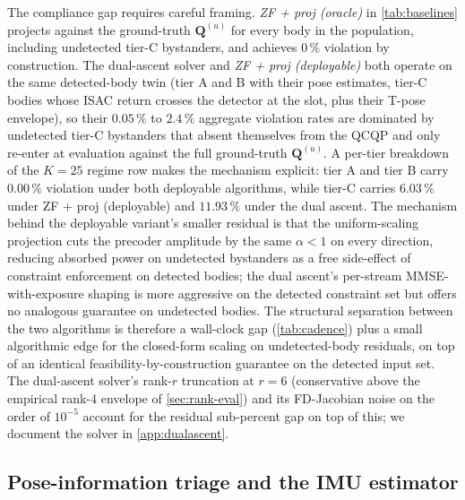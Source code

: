 \documentclass[journal,twocolumn,10pt]{IEEEtran}
\theoremstyle{plain}
\theoremstyle{remark}
\newcommand{\Qmat}{\mathbf{Q}}
\begin{document}
The compliance gap requires careful framing. \emph{ZF + proj
(oracle)} in \cref{tab:baselines} projects against the ground-truth
$\Qmat^{(u)}$ for every body in the population, including
undetected tier-C bystanders, and achieves $0\,\%$ violation by
construction. The dual-ascent solver and \emph{ZF + proj
(deployable)} both operate on the same detected-body twin (tier A
and B with their pose estimates, tier-C bodies whose ISAC return
crosses the detector at the slot, plus their T-pose envelope), so
their $0.05\,\%$ to $2.4\,\%$ aggregate violation rates are
dominated by undetected tier-C bystanders that absent themselves
from the QCQP and only re-enter at evaluation against the full
ground-truth $\Qmat^{(u)}$. A per-tier breakdown of the $K = 25$
regime row makes the mechanism explicit: tier A and tier B carry
$0.00\,\%$ violation under both deployable algorithms, while
tier-C carries $6.03\,\%$ under ZF + proj (deployable) and
$11.93\,\%$ under the dual ascent. The mechanism behind the
deployable variant's smaller residual is that the uniform-scaling
projection cuts the precoder amplitude by the same $\alpha < 1$
on every direction, reducing absorbed power on undetected bystanders
as a free side-effect of constraint enforcement on detected bodies;
the dual ascent's per-stream MMSE-with-exposure shaping is more
aggressive on the detected constraint set but offers no analogous
guarantee on undetected bodies. The structural separation between
the two algorithms is therefore a wall-clock gap (\cref{tab:cadence})
plus a small algorithmic edge for the closed-form scaling on
undetected-body residuals, on top of an identical
feasibility-by-construction guarantee on the detected input set.
The dual-ascent solver's rank-$r$ truncation at $r = 6$
(conservative above the empirical rank-4 envelope of
\cref{sec:rank-eval}) and its FD-Jacobian noise on the order of
$10^{-5}$ account for the residual sub-percent gap on top of this;
we document the solver in \cref{app:dualascent}.

\subsection{Pose-information triage and the IMU
estimator}\label{sec:eval-imu}
\end{document}
